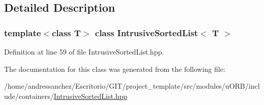 \subsection{Detailed Description}
\subsubsection*{template$<$class T$>$\newline
class Intrusive\+Sorted\+List$<$ T $>$}



Definition at line 59 of file Intrusive\+Sorted\+List.\+hpp.



The documentation for this class was generated from the following file\+:\begin{DoxyCompactItemize}
\item 
/home/andressanchez/\+Escritorio/\+G\+I\+T/project\+\_\+template/src/modules/u\+O\+R\+B/include/containers/\hyperlink{IntrusiveSortedList_8hpp}{Intrusive\+Sorted\+List.\+hpp}\end{DoxyCompactItemize}
